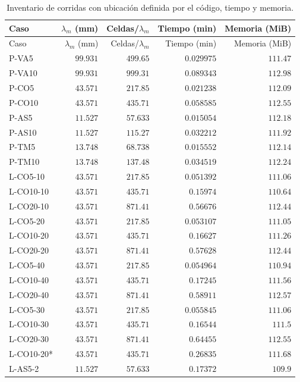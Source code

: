 \begin{longtable}{lrrrr}
\caption{Inventario de corridas con ubicación definida por el código, tiempo y memoria.}\label{t:inv}\\
\hline Caso & $\lambda_m$ (mm) & Celdas/$\lambda_m$ & Tiempo (min) & Memoria (MiB) \\ \hline\endfirsthead
\hline Caso & $\lambda_m$ (mm) & Celdas/$\lambda_m$ & Tiempo (min) & Memoria (MiB) \\ \hline\endhead
P-VA5 & $99.931$ & $499.65$ & $0.029975$ & $111.47$ \\
P-VA10 & $99.931$ & $999.31$ & $0.089343$ & $112.98$ \\
P-CO5 & $43.571$ & $217.85$ & $0.021238$ & $112.09$ \\
P-CO10 & $43.571$ & $435.71$ & $0.058585$ & $112.55$ \\
P-AS5 & $11.527$ & $57.633$ & $0.015054$ & $112.18$ \\
P-AS10 & $11.527$ & $115.27$ & $0.032212$ & $111.92$ \\
P-TM5 & $13.748$ & $68.738$ & $0.015552$ & $112.14$ \\
P-TM10 & $13.748$ & $137.48$ & $0.034519$ & $112.24$ \\
L-CO5-10 & $43.571$ & $217.85$ & $0.051392$ & $111.06$ \\
L-CO10-10 & $43.571$ & $435.71$ & $0.15974$ & $110.64$ \\
L-CO20-10 & $43.571$ & $871.41$ & $0.56676$ & $112.44$ \\
L-CO5-20 & $43.571$ & $217.85$ & $0.053107$ & $111.05$ \\
L-CO10-20 & $43.571$ & $435.71$ & $0.16627$ & $111.26$ \\
L-CO20-20 & $43.571$ & $871.41$ & $0.57628$ & $112.44$ \\
L-CO5-40 & $43.571$ & $217.85$ & $0.054964$ & $110.94$ \\
L-CO10-40 & $43.571$ & $435.71$ & $0.17245$ & $111.56$ \\
L-CO20-40 & $43.571$ & $871.41$ & $0.58911$ & $112.57$ \\
L-CO5-30 & $43.571$ & $217.85$ & $0.055845$ & $111.06$ \\
L-CO10-30 & $43.571$ & $435.71$ & $0.16544$ & $111.5$ \\
L-CO20-30 & $43.571$ & $871.41$ & $0.64455$ & $112.55$ \\
L-CO10-20* & $43.571$ & $435.71$ & $0.26835$ & $111.68$ \\
L-AS5-2 & $11.527$ & $57.633$ & $0.17372$ & $109.9$ \\

\end{longtable}
